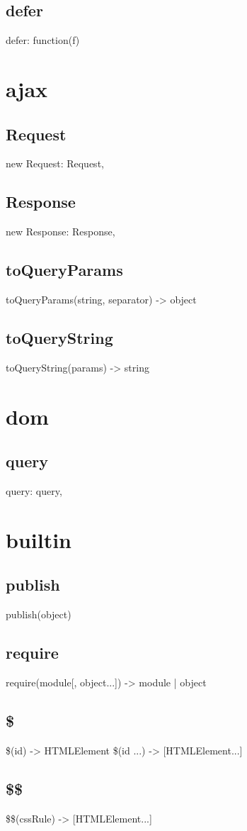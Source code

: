 {{{{{{{\subsection*{defer}
defer: function(f) {

\section{ajax}
\subsection*{Request}
new Request: Request,
\subsection*{Response}
new Response: Response,
\subsection*{toQueryParams}
toQueryParams(string, separator) -> object
\subsection*{toQueryString}
toQueryString(params) -> string

\section{dom}
\subsection*{query}
query: query,

\section{builtin}
\subsection*{publish}
publish(object)
\subsection*{require}
require(module[, object...]) -> module | object
\subsection*{\$}
\$(id) -> HTMLElement
\$(id ...) -> [HTMLElement...]
\subsection*{\$\$}
\$\$(cssRule) -> [HTMLElement...]
}}}}}}}}
